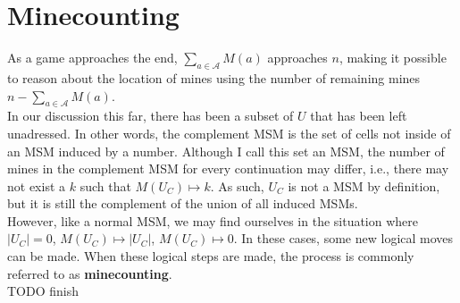 \section{Minecounting}
As a game approaches the end, $\sum_{a\in\mathcal{A}}M(a)$ approaches $n$, making it possible to reason about the location of mines using the number of remaining mines $n-\sum_{a\in\mathcal{A}}M(a)$.\\

In our discussion this far, there has been a subset of $U$ that has been left unadressed.
In other words, the complement MSM is the set of cells not inside of an MSM induced by a number. Although I call this set an MSM, the number of mines in the complement MSM for every continuation may differ, i.e., there may not exist a $k$ such that $M(U_C)\mapsto k$. As such, $U_C$ is not a MSM by definition, but it is still the complement of the union of all induced MSMs.\\

However, like a normal MSM, we may find ourselves in the situation where $|U_C|=0$, $M(U_C)\mapsto |U_C|$, $M(U_C)\mapsto 0$. In these cases, some new logical moves can be made. When these logical steps are made, the process is commonly referred to as \textbf{minecounting}.\\

TODO finish